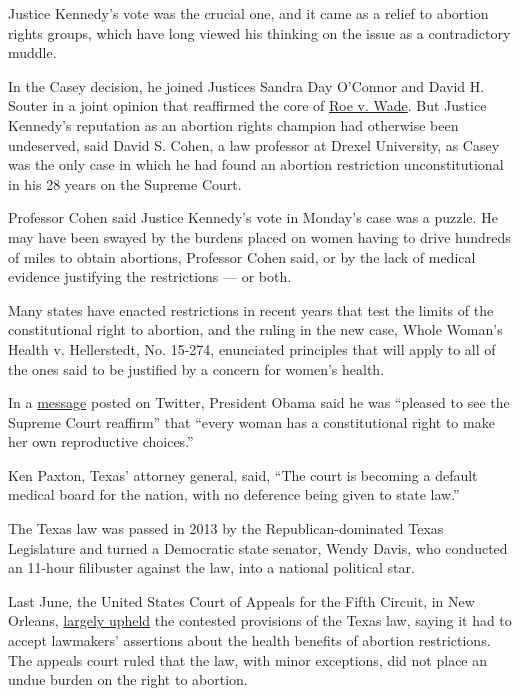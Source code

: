 Justice Kennedy's vote was the crucial one, and it came as a relief to
abortion rights groups, which have long viewed his thinking on the issue
as a contradictory muddle.

In the Casey decision, he joined Justices Sandra Day O'Connor and David
H. Souter in a joint opinion that reaffirmed the core of
\href{http://caselaw.lp.findlaw.com/scripts/getcase.pl?court=US\&vol=410\&invol=113}{Roe
v. Wade}. But Justice Kennedy's reputation as an abortion rights
champion had otherwise been undeserved, said David S. Cohen, a law
professor at Drexel University, as Casey was the only case in which he
had found an abortion restriction unconstitutional in his 28 years on
the Supreme Court.

Professor Cohen said Justice Kennedy's vote in Monday's case was a
puzzle. He may have been swayed by the burdens placed on women having to
drive hundreds of miles to obtain abortions, Professor Cohen said, or by
the lack of medical evidence justifying the restrictions --- or both.

Many states have enacted restrictions in recent years that test the
limits of the constitutional right to abortion, and the ruling in the
new case, Whole Woman's Health v. Hellerstedt, No. 15-274, enunciated
principles that will apply to all of the ones said to be justified by a
concern for women's health.

In a
\href{https://twitter.com/WhiteHouse/status/747470028635774976?lang=en}{message}
posted on Twitter, President Obama said he was ``pleased to see the
Supreme Court reaffirm'' that ``every woman has a constitutional right
to make her own reproductive choices.''

Ken Paxton, Texas' attorney general, said, ``The court is becoming a
default medical board for the nation, with no deference being given to
state law.''

The Texas law was passed in 2013 by the Republican-dominated Texas
Legislature and turned a Democratic state senator, Wendy Davis, who
conducted an 11-hour filibuster against the law, into a national
political star.

Last June, the United States Court of Appeals for the Fifth Circuit, in
New Orleans,
\href{http://www.ca5.uscourts.gov/opinions\%5Cpub\%5C14/14-50928-CV0.pdf}{largely
upheld} the contested provisions of the Texas law, saying it had to
accept lawmakers' assertions about the health benefits of abortion
restrictions. The appeals court ruled that the law, with minor
exceptions, did not place an undue burden on the right to abortion.

